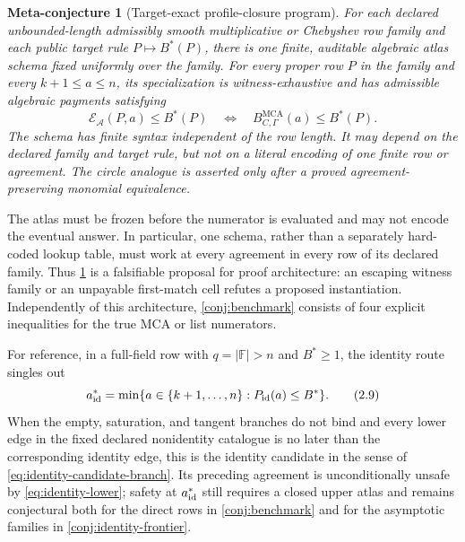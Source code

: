 \documentclass[a4paper,11pt]{amsart}
\newtheorem{metaconjecture}[theorem]{Meta-conjecture}
\theoremstyle{remark}
\DeclareMathOperator{\MCA}{MCA}
\newcommand{\F}{\mathbb F}
\newcommand{\Gam}{\Gamma}
\newcommand{\abs}[1]{\lvert#1\rvert}
\begin{document}
\begin{metaconjecture}[Target-exact profile-closure program]\label{meta:profile-envelope}
For each declared unbounded-length admissibly smooth multiplicative or
Chebyshev row family
and each public target rule \(P\mapsto B^*(P)\), there is one finite,
auditable algebraic atlas schema fixed uniformly over the family.  For every
proper row \(P\) in the family and every \(k+1\le a\le n\), its
specialization is witness-exhaustive and has admissible algebraic payments
satisfying
\[
 \mathcal E_{\mathcal A}(P,a)\le B^*(P)
 \quad\Longleftrightarrow\quad
 B_{C,\Gam}^{\MCA}(a)\le B^*(P).                  \tag{2.8}\label{eq:profile-envelope}
\]
The schema has finite syntax independent of the row length.  It may depend on
the declared family and target rule, but not on a literal encoding of one
finite row or agreement.  The circle analogue is
asserted only after a proved agreement-preserving monomial equivalence.
\end{metaconjecture}

The atlas must be frozen before the numerator is evaluated and may not encode
the eventual answer.  In particular, one schema, rather than a separately
hard-coded lookup table, must work at every agreement in every row of its
declared family.  Thus
\cref{meta:profile-envelope} is a falsifiable proposal for proof
architecture: an escaping witness family or an unpayable first-match cell
refutes a proposed instantiation.  Independently of this architecture,
\cref{conj:benchmark} consists of four explicit inequalities for the true
MCA or list numerators.

For reference, in a full-field row with \(q=\abs\F>n\) and \(B^*\ge1\), the
identity route singles out
\[
 a_{\rm id}^*
 =\min\{a\in\{k+1,\ldots,n\}:P_{\rm id}(a)\le B^*\}. \tag{2.9}\label{eq:identity-candidate}
\]
When the empty, saturation, and tangent branches do not bind and every lower
edge in the fixed declared nonidentity catalogue is no later than the corresponding
identity edge, this is the identity candidate in the sense of
\eqref{eq:identity-candidate-branch}.  Its preceding agreement is
unconditionally unsafe by \eqref{eq:identity-lower}; safety at
\(a_{\rm id}^*\) still requires a closed upper atlas and remains conjectural
both for the direct rows in \cref{conj:benchmark} and for the asymptotic
families in \cref{conj:identity-frontier}.
\end{document}

